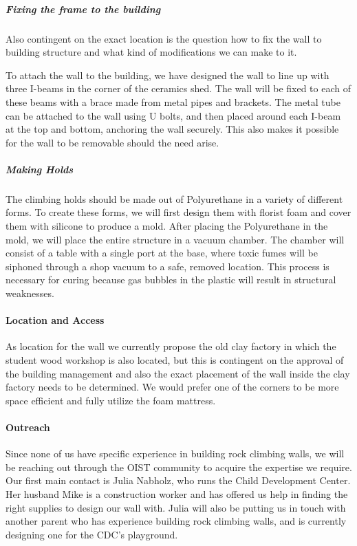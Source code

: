 \documentclass[a4paper, 12pt]{scrartcl}
\begin{document}
\subparagraph{Fixing the frame to the building}
Also contingent on the exact location is the question how to fix the wall to building structure and what kind of modifications we can make to it.

To attach the wall to the building, we have designed the wall to line up with three I-beams in the corner of the ceramics shed. The wall will be fixed to each of these beams with a brace made from metal pipes and brackets. The metal tube can be attached to the wall using U bolts, and then placed around each I-beam at the top and bottom, anchoring the wall securely. This also makes it possible for the wall to be removable should the need arise.

\subparagraph{Making Holds}
The climbing holds should be made out of Polyurethane in a variety of different forms. To create these forms, we will first design them with florist foam and cover them with silicone to produce a mold. After placing the Polyurethane in the mold, we will place the entire structure in a vacuum chamber. The chamber will consist of a table with a single port at the base, where toxic fumes will be siphoned through a shop vacuum to a safe, removed location. This process is necessary for curing because gas bubbles in the plastic will result in structural weaknesses. 


\paragraph{Location and Access}
As location for the wall we currently propose the old clay factory in which the student wood workshop is also located, but this is contingent on the approval of the building management and also the exact placement of the wall inside the clay factory needs to be determined. We would prefer one of the corners to be more space efficient and fully utilize the foam mattress.



\paragraph{Outreach}
Since none of us have specific experience in building rock climbing walls, we will be reaching out through the OIST community to acquire the expertise we require. Our first main contact is Julia Nabholz, who runs the Child Development Center. Her husband Mike is a construction worker and has offered us help in finding the right supplies to design our wall with. Julia will also be putting us in touch with another parent who has experience building rock climbing walls, and is currently designing one for the CDC's playground.
\end{document}
